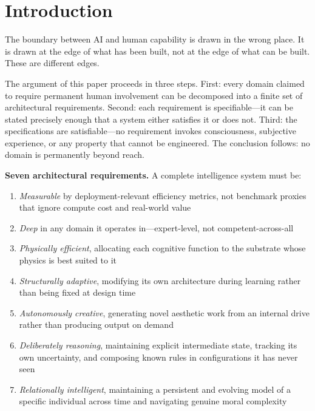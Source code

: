 \documentclass[12pt]{article}
\begin{document}
\section{Introduction}
\label{sec:intro}

The boundary between AI and human capability is drawn in the wrong place. It is drawn at the edge of what has been built, not at the edge of what can be built. These are different edges.

The argument of this paper proceeds in three steps. First: every domain claimed to require permanent human involvement can be decomposed into a finite set of architectural requirements. Second: each requirement is specifiable---it can be stated precisely enough that a system either satisfies it or does not. Third: the specifications are satisfiable---no requirement invokes consciousness, subjective experience, or any property that cannot be engineered. The conclusion follows: no domain is permanently beyond reach.

\textbf{Seven architectural requirements.} A complete intelligence system must be:

\begin{enumerate}
    \item \textit{Measurable} by deployment-relevant efficiency metrics, not benchmark proxies that ignore compute cost and real-world value
    \item \textit{Deep} in any domain it operates in---expert-level, not competent-across-all
    \item \textit{Physically efficient}, allocating each cognitive function to the substrate whose physics is best suited to it
    \item \textit{Structurally adaptive}, modifying its own architecture during learning rather than being fixed at design time
    \item \textit{Autonomously creative}, generating novel aesthetic work from an internal drive rather than producing output on demand
    \item \textit{Deliberately reasoning}, maintaining explicit intermediate state, tracking its own uncertainty, and composing known rules in configurations it has never seen
    \item \textit{Relationally intelligent}, maintaining a persistent and evolving model of a specific individual across time and navigating genuine moral complexity
\end{enumerate}
\end{document}
